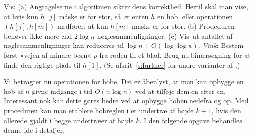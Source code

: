 \begin{exerc}
Vis: 
(a) Angtagelserne i algoritmen sikrer dens korrekthed. 
Hertil skal man vise, at hvis kun $h[j]$ måske er for stor,
så er enten $h$ en hob, eller operationen $(h[j],h[m])$ medfører, at kun $h[m]$ måske er for stor.
(b)
Prodeduren  behøver ikke mere end $2\log n$ nøglesammenligninger. 
(c) Vis, at antallet af nøglesammenligninger kan reduceres til $\log n +O(\log\log n)$.
\emph{Vink}: 
Bestem først »vejen af mindre børn« $p$ fra roden til et blad.
Brug nu binærsøgning for at finde den rigtige plads til $h[1]$.
(Se afsnit~\ref{s:further} for andre varianter af .)
\end{exerc}

Vi betragter nu operationen  for hobe.
Det er åbenlyst, at man kan opbygge en hob af $n$ givne indgange i tid $O(n\log n)$ 
ved at tilføje dem en efter en.
Interessant nok kan dette gøres bedre ved at opbygge hoben nedefra og op.
Med proceduren  kan man etablere hobreglen i et undertræ af højde $k+1$, hvis den allerede gjaldt i begge undertræer af højde $k$.
I den følgende opgave behandles denne ide i detaljer.

